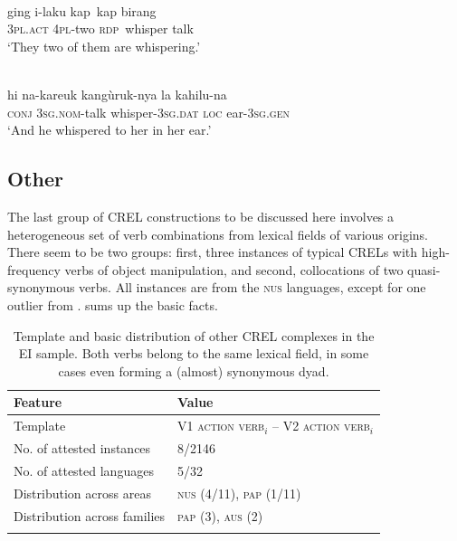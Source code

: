 \ea \label{WesternPantar030}
\\
\gll ging i-laku kap~kap birang \\
\textsc{3}\textsc{pl}.\textsc{act} \textsc{4}\textsc{pl}-two \textsc{rdp}~whisper talk \\
\glft `They two of them are whispering.'\\ 
\z

\ea \label{Kambera004}
\\
\gll hi na-kareuk kangùruk-nya la kahilu-na \\
\textsc{conj} \textsc{3}\textsc{sg}.\textsc{nom}-talk whisper-\textsc{3}\textsc{sg}.\textsc{dat} \textsc{loc} ear-\textsc{3}\textsc{sg}.\textsc{gen} \\
\glft `And he whispered to her in her ear.'\\ 
\z

\subsection{Other} \label{sec:other}
The last group of CREL constructions to be discussed here involves a heterogeneous set of verb combinations from lexical fields of various origins. There seem to be two groups: first, three instances of typical CRELs with high-frequency verbs of object manipulation, and second, collocations of two quasi-synonymous verbs. All instances are from the \textsc{nus} languages, except for one outlier from .  sums up the basic facts.

\begin{table}
\begin{tabular}{ll}
\lsptoprule
Feature&Value\tabularnewline
\midrule
Template&V1 \textsc{action verb}$_{i}$ -- V2 \textsc{action verb}$_{i}$\tabularnewline
No. of attested instances& 8/2146 \tabularnewline
No. of attested languages& 5/32 \tabularnewline
Distribution across areas& \textsc{nus} (4/11), \textsc{pap} (1/11) \tabularnewline
Distribution across families& \textsc{pap} (3), \textsc{aus} (2) \tabularnewline
\lspbottomrule
\end{tabular}
\caption[Template and basic distribution of other CREL complexes]{Template and basic distribution of other CREL complexes in the EI sample. Both verbs belong to the same lexical field, in some cases even forming a (almost) synonymous dyad.}
\label{table:basiccrelother}
\end{table}

